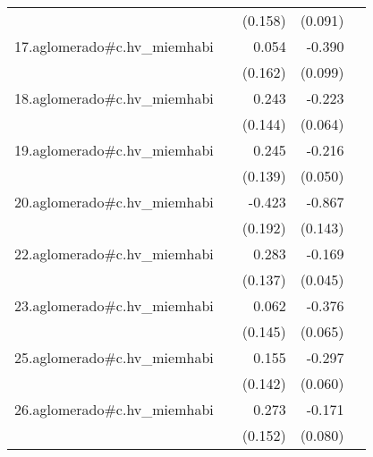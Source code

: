 {\begin{longtable}{l*{4}{D{.}{.}{-1}}}
            &                     &     (0.158)         &     (0.091)         &                     \\
\addlinespace
17.aglomerado#c.hv\_miemhabi&                     &       0.054         &      -0.390\sym{***}&                     \\
            &                     &     (0.162)         &     (0.099)         &                     \\
\addlinespace
18.aglomerado#c.hv\_miemhabi&                     &       0.243         &      -0.223\sym{***}&                     \\
            &                     &     (0.144)         &     (0.064)         &                     \\
\addlinespace
19.aglomerado#c.hv\_miemhabi&                     &       0.245         &      -0.216\sym{***}&                     \\
            &                     &     (0.139)         &     (0.050)         &                     \\
\addlinespace
20.aglomerado#c.hv\_miemhabi&                     &      -0.423\sym{*}  &      -0.867\sym{***}&                     \\
            &                     &     (0.192)         &     (0.143)         &                     \\
\addlinespace
22.aglomerado#c.hv\_miemhabi&                     &       0.283\sym{*}  &      -0.169\sym{***}&                     \\
            &                     &     (0.137)         &     (0.045)         &                     \\
\addlinespace
23.aglomerado#c.hv\_miemhabi&                     &       0.062         &      -0.376\sym{***}&                     \\
            &                     &     (0.145)         &     (0.065)         &                     \\
\addlinespace
25.aglomerado#c.hv\_miemhabi&                     &       0.155         &      -0.297\sym{***}&                     \\
            &                     &     (0.142)         &     (0.060)         &                     \\
\addlinespace
26.aglomerado#c.hv\_miemhabi&                     &       0.273         &      -0.171\sym{*}  &                     \\
            &                     &     (0.152)         &     (0.080)         &                     \\

\end{longtable}}
